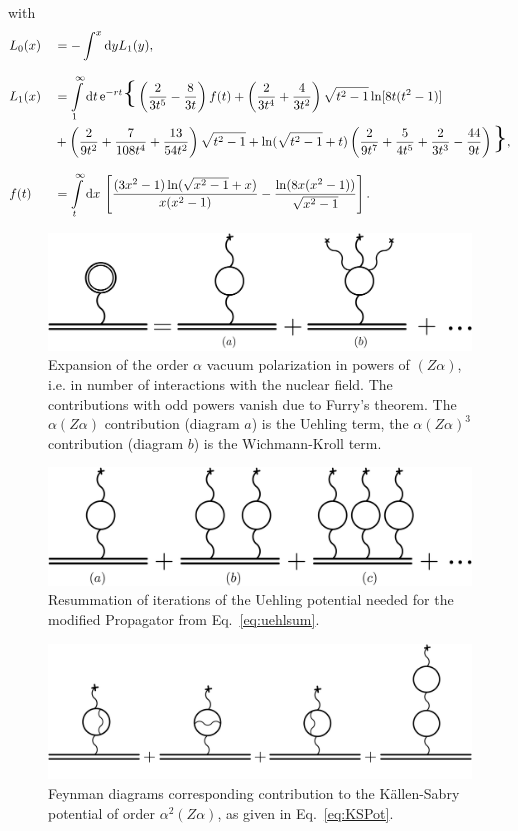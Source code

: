 with
\begin{alignat}{2}
&L_0(x)&&=-\int^x\text{d}yL_1(y),\\[7.5pt]
&L_1(x) &&= \int\limits_1^\infty\text{d}t\,\e^{-rt}\text{\huge\{}
\left(\frac{2}{3t^5}-\frac{8}{3t}\right)f(t)
+\left(\frac{2}{3t^4}+\frac{4}{3t^2}\right)\sqrt{t^2-1}\ln[8t(t^2-1)]\\
&&&+\left(\frac{2}{9t^2}+\frac{7}{108t^4}+\frac{13}{54t^2}\right)\sqrt{t^2-1}
+\ln (\sqrt{t^2-1}+t)\left(\frac{2}{9t^7}+\frac{5}{4t^5}+\frac{2}{3t^3}-\frac{44}{9t}\right)
\text{\huge\}},\\[7.5pt]
&f(t) &&= \int\limits_t^\infty\text{d}x\,
\left[
\frac{(3x^2-1)\ln (\sqrt{x^2-1}+x)}{x(x^2-1)}-
\frac{\ln(8x(x^2-1))}{\sqrt{x^2-1}}
\right].
\end{alignat}
%
\begin{figure}%
\centering
\includegraphics[width=0.75\linewidth]{pics/vac_pol_wk.pdf}%
\caption{Expansion of the order $\alpha$ vacuum polarization in powers of $(Z\alpha)$, i.e. in number of interactions with the nuclear field. The contributions with odd powers vanish due to Furry's theorem. The $\alpha(Z\alpha)$ contribution (diagram $a$) is the Uehling term, the $\alpha(Z\alpha)^3$ contribution (diagram $b$) is the Wichmann-Kroll term.}%
\label{fig:vac_pol_wk}%
\end{figure}
%
%
\begin{figure}%
\centering
\includegraphics[width=0.8\linewidth]{pics/vac_pol_uehl.pdf}%
\caption{Resummation of iterations of the Uehling potential needed for the modified Propagator from Eq.~\eqref{eq:uehlsum}.}%
\label{fig:vac_pol_uehl}%
\end{figure}
%
%
\begin{figure}%
\centering
\includegraphics[width=0.9\linewidth]{pics/vac_pol_ks.pdf}%
\caption{Feynman diagrams corresponding contribution to the Källen-Sabry potential of order $\alpha^2(Z\alpha)$, as given in Eq.~\eqref{eq:KSPot}.}%
\label{fig:vac_pol_ks}%
\end{figure}
%
